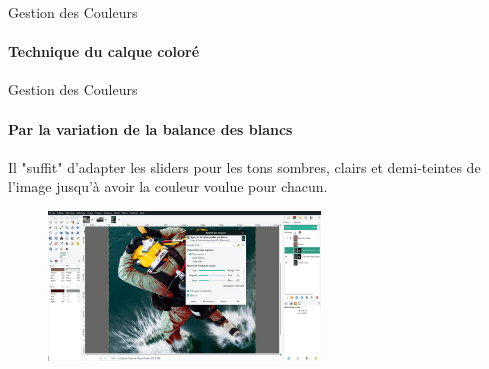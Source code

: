 \documentclass[10pt,svgnames,usenames,table]{beamer}
\begin{document}
	\begin{frame}{Gestion des Couleurs}
	\framesubtitle{Technique du calque coloré}
		\begin{enumerate}
		\end{enumerate}

			
	\end{frame}		

	\begin{frame}{Gestion des Couleurs}
	\framesubtitle{Par la variation de la balance des blancs}
		Il "suffit" d'adapter les sliders pour les tons sombres, clairs et demi-teintes de l'image jusqu'à avoir la couleur voulue pour chacun.
		\begin{figure}[H]
			\centering
				\includegraphics[height=150px]{Images/colours/col9} 
			\end{figure}			
	\end{frame}	
	
\end{document}
